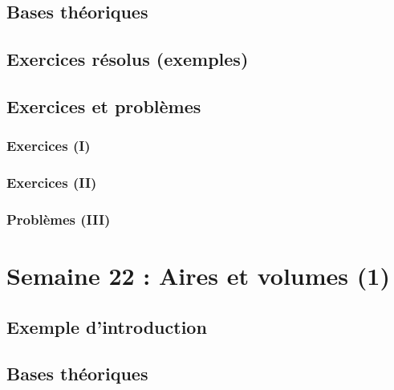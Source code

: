 \documentclass[
  12pt,
]{book}
\begin{document}
\hypertarget{bases-thuxe9oriques-20}{%
\section{Bases théoriques}\label{bases-thuxe9oriques-20}}

\hypertarget{exercices-ruxe9solus-exemples-20}{%
\section{Exercices résolus (exemples)}\label{exercices-ruxe9solus-exemples-20}}

\hypertarget{exercices-et-probluxe8mes-20}{%
\section{Exercices et problèmes}\label{exercices-et-probluxe8mes-20}}

\hypertarget{exercices-i-20}{%
\subsection{Exercices (I)}\label{exercices-i-20}}

\hypertarget{exercices-ii-20}{%
\subsection{Exercices (II)}\label{exercices-ii-20}}

\hypertarget{probluxe8mes-iii-20}{%
\subsection{Problèmes (III)}\label{probluxe8mes-iii-20}}

\hypertarget{semaine-22-aires-et-volumes-1}{%
\chapter{Semaine 22 : Aires et volumes (1)}\label{semaine-22-aires-et-volumes-1}}

\hypertarget{exemple-dintroduction-21}{%
\section{Exemple d'introduction}\label{exemple-dintroduction-21}}

\hypertarget{bases-thuxe9oriques-21}{%
\section{Bases théoriques}\label{bases-thuxe9oriques-21}}
\end{document}

